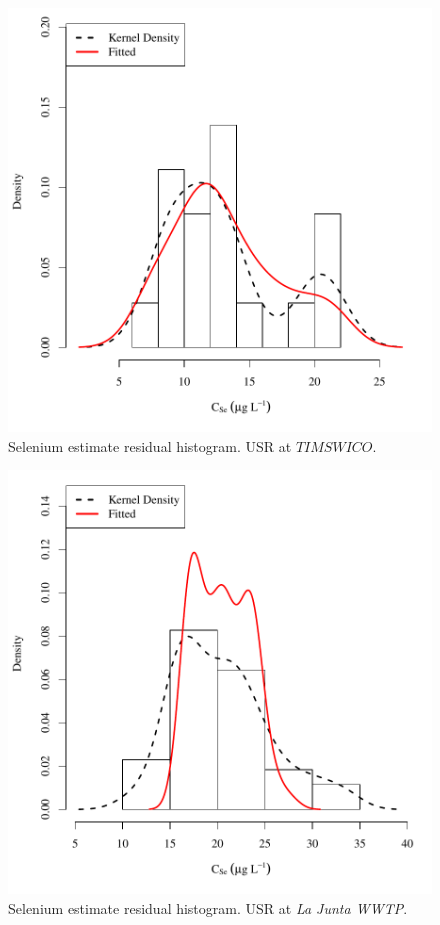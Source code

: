 \begin{figure}[htbp]
	\begin{center}
	\includegraphics[width=6in]{"Figures/Results_USR/Conc Model ResDist TIM"}
	\caption{Selenium estimate residual histogram.  USR at $TIMSWICO$.}
	\end{center}
\end{figure}
\newpage

\begin{figure}[htbp]
	\begin{center}
	\includegraphics[width=6in]{"Figures/Results_USR/Conc Model ResDist WTP"}
	\caption{Selenium estimate residual histogram.  USR at \textit{La Junta WWTP}.}
	\end{center}
\end{figure}
\newpage

